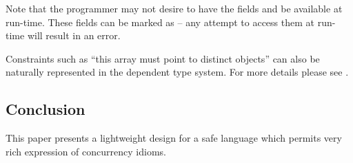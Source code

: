 Note that the programmer may not desire to have the fields 
and  be available at run-time. These fields can be marked
as  -- any attempt to access them at run-time will result
in an error.

Constraints such as ``this array must point to distinct objects'' can
also be naturally represented in the dependent type system. For more
details please see \cite{effects-constrained-types}.

\subsection{Conclusion}

This paper presents a lightweight design for a safe language which
permits very rich expression of concurrency idioms.
